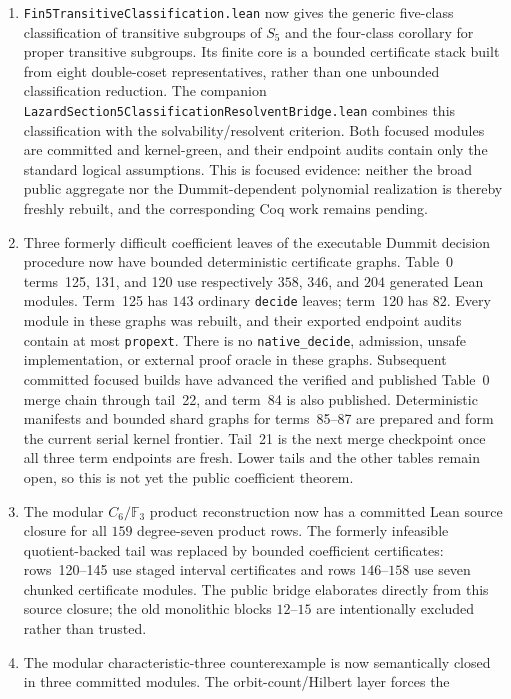 \documentclass[11pt,a4paper,oneside]{article}
\newcommand{\lean}[1]{\nolinkurl{#1}}
\begin{document}
\begin{enumerate}
\item \texttt{Fin5TransitiveClassification.lean} now gives the generic
  five-class classification of transitive subgroups of $S_5$ and the
  four-class corollary for proper transitive subgroups.  Its finite core is a
  bounded certificate stack built from eight double-coset representatives,
  rather than one unbounded classification reduction.  The companion
  \lean{LazardSection5ClassificationResolventBridge.lean} combines this
  classification with the solvability/resolvent criterion.  Both focused
  modules are committed and kernel-green, and their endpoint audits contain
  only the standard logical assumptions.  This is focused evidence: neither
  the broad public aggregate nor the Dummit-dependent polynomial realization
  is thereby freshly rebuilt, and the corresponding Coq work remains
  pending.
\item Three formerly difficult coefficient leaves of the executable Dummit
  decision procedure now have bounded deterministic certificate graphs.
  Table~0 terms~125, 131, and 120 use respectively $358$, $346$, and $204$
  generated Lean modules.  Term~125 has $143$ ordinary \lean{decide} leaves;
  term~120 has $82$.  Every module in these graphs was rebuilt, and their
  exported endpoint audits contain at most \lean{propext}.  There is no
  \lean{native_decide}, admission, unsafe implementation, or external proof
  oracle in these graphs.  Subsequent committed focused builds have advanced
  the verified and published Table~0 merge chain through tail~22, and
  term~84 is also published.  Deterministic manifests and bounded shard
  graphs for terms~85--87 are prepared and form the current serial kernel
  frontier.  Tail~21 is the next merge checkpoint once all three term
  endpoints are fresh.  Lower tails and the other tables remain open, so this
  is not yet the public coefficient theorem.
\item The modular $C_6/\mathbb F_3$ product reconstruction now has a committed
  Lean source closure for all $159$ degree-seven product rows.  The formerly
  infeasible quotient-backed tail was replaced by bounded coefficient
  certificates: rows~120--145 use staged interval certificates and rows
  $146$--$158$ use seven chunked certificate modules.  The public bridge
  elaborates directly from this source closure; the old monolithic blocks
  $12$--$15$ are intentionally excluded rather than trusted.
\item The modular characteristic-three counterexample is now semantically
  closed in three committed modules.  The orbit-count/Hilbert layer forces the

\end{enumerate}
\end{document}
